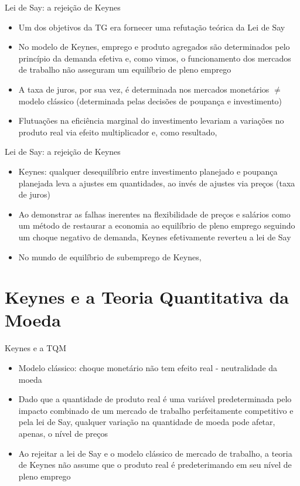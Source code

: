 \documentclass[10pt]{beamer}
\begin{document}
\begin{frame}{Lei de Say: a rejeição de Keynes}
    \begin{itemize}
        \item Um dos objetivos da TG era fornecer uma refutação teórica da Lei de Say
        \bigskip
        \item No modelo de Keynes, emprego e produto agregados são determinados pelo princípio da demanda efetiva e, como vimos, o funcionamento dos mercados de trabalho não asseguram um equilíbrio de pleno emprego
        \bigskip
        \item A taxa de juros, por sua vez, é determinada nos mercados monetários $\neq$ modelo clássico (determinada pelas decisões de poupança e investimento)
        \bigskip
        \item Flutuações na eficiência marginal do investimento levariam a variações no produto real via efeito multiplicador e, como resultado, 
    \end{itemize}
\end{frame}

\begin{frame}{Lei de Say: a rejeição de Keynes}
    \begin{itemize}
        \item Keynes: qualquer desequilíbrio entre investimento planejado e poupança planejada leva a ajustes em quantidades, ao invés de ajustes via preços (taxa de juros)
        \bigskip
        \item Ao demonstrar as falhas inerentes na flexibilidade de preços e salários como um método de restaurar a economia ao equilíbrio de pleno emprego seguindo um choque negativo de demanda, Keynes efetivamente reverteu a lei de Say
        \bigskip
        \item No mundo de equilíbrio de subemprego de Keynes, 
    \end{itemize}
\end{frame}


\section{Keynes e a Teoria Quantitativa da Moeda}
\begin{frame}{Keynes e a TQM}
    \begin{itemize}
        \item Modelo clássico: choque monetário não tem efeito real - neutralidade da moeda
        \bigskip
        \item Dado que a quantidade de produto real é uma variável predeterminada pelo impacto combinado de um mercado de trabalho perfeitamente competitivo e pela lei de Say, qualquer variação na quantidade de moeda pode afetar, apenas, o nível de preços
        \bigskip
        \item Ao rejeitar a lei de Say e o modelo clássico de mercado de trabalho, a teoria de Keynes não assume que o produto real é predeterimando em seu nível de pleno emprego
    \end{itemize}
\end{frame}
\end{document}
